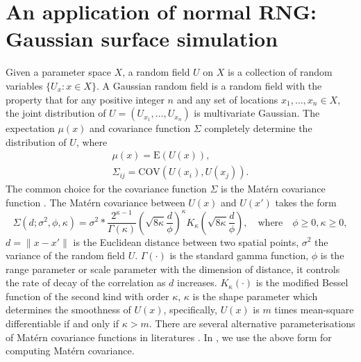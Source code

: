 \documentclass[article,nojss]{jss}\usepackage[]{graphicx}\usepackage[]{color}
\def\cov{{\text{COV}}}
\def\E{{\text{E}}}
\begin{document}
\section{An application of normal RNG: Gaussian surface simulation} 
Given a parameter space $X$, a random field $U$ on $X$ is a collection of random variables $\{U_x :x\in X\}$. A Gaussian random field is a random field with the property that for any positive integer $n$ and any set of locations $x_1,\dots,x_n \in X$, the joint distribution of $U=(U_{x_1},\dots,U_{x_n})$ is multivariate Gaussian. The expectation $\mu(x)$ and covariance function $\Sigma$ completely determine the distribution of $U$, where 
\begin{gather*} 
\mu(x) = \E (U(x)),\\
\Sigma_{ij} = \cov (U(x_i),U(x_j)).
\end{gather*}
The common choice for the covariance function $\Sigma$ is the Mat\'ern covariance function \citep{matern1960spatial}. The Mat\'ern covariance between $U(x)$ and $U(x')$ takes the form 
\begin{equation*}
\Sigma(d;\sigma^2,\phi,\kappa)=\sigma^2*\frac{2^{\kappa-1}}{\Gamma(\kappa)} (\sqrt{8\kappa} \frac{d}{\phi})^\kappa  K_\kappa(\sqrt{8\kappa}  \frac{d}{\phi}),  \quad \text{where} \quad \phi    \geq 0,  \kappa     \geq 0,
\end{equation*} 
$d =\|x-x'\|$ is the Euclidean distance between two spatial points, 
$\sigma^2$ the variance of the random field $U$.
$\Gamma(\cdot)$ is the standard gamma function,  $\phi$ is the range parameter or scale parameter with the dimension of distance, it controls the rate of decay of the correlation as $d$ increases. $K_\kappa(\cdot)$ is the modified Bessel function of the second kind with order $\kappa$, $\kappa$ is the shape parameter which determines the smoothness of $U(x)$, specifically, $U(x)$ is $m$ times mean-square differentiable if and only if $\kappa > m$. %
There are several alternative parameterisations of Mat\'ern covariance functions in literatures  \citep[see][]{haskard2007anisotropic}. In , we use the above form for computing Mat\'ern covariance.
\end{document}
